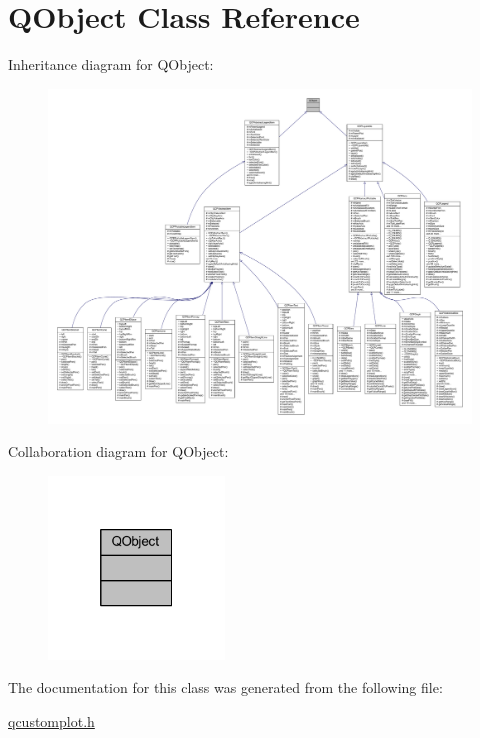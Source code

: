 \hypertarget{a00059}{\section{Q\+Object Class Reference}
\label{a00059}
}


Inheritance diagram for Q\+Object\+:
\nopagebreak
\begin{figure}[H]
\begin{center}
\leavevmode
\includegraphics[width=350pt]{dd/d5a/a00538}
\end{center}
\end{figure}


Collaboration diagram for Q\+Object\+:
\nopagebreak
\begin{figure}[H]
\begin{center}
\leavevmode
\includegraphics[width=133pt]{d3/d87/a00539}
\end{center}
\end{figure}


The documentation for this class was generated from the following file\+:\begin{DoxyCompactItemize}
\item 
\hyperlink{a00116}{qcustomplot.\+h}\end{DoxyCompactItemize}
